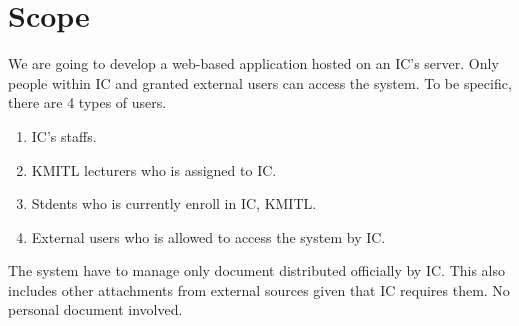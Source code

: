 \section{Scope}
We are going to develop a web-based application hosted on an IC's server.
Only people within IC and granted external users can access the system.
To be specific, there are 4 types of users.
\begin{enumerate}
\item IC's staffs.
\item KMITL lecturers who is assigned to IC.
\item Stdents who is currently enroll in IC, KMITL.
\item External users who is allowed to access the system by IC.
\end{enumerate}

The system have to manage only document distributed officially by IC.
This also includes other attachments from external sources given that IC requires them.
No personal document involved.